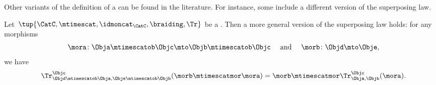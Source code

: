 
\begin{remark}
    Other variants of the definition of a  can be found in the literature. For instance, some include a different version of the superposing law.
\end{remark}

\begin{lemma}
    \label{lem:general-superposing-law}
    Let~$\tup{\CatC, \mtimescat,\idmoncat_{\CatC}, \braiding, \Tr}$ be a .
    Then a more general version of the superposing law holds: for any morphisms~
    $$\mora\colon \Obja\mtimescatob \Objc \mto \Objb \mtimescatob \Objc \quad \text{ and } \quad \morb \colon \Objd \mto \Obje,$$
    we have 
    \begin{equation}
        \label{eq:superposing_2}
        \Tr_{\Objd\mtimescatob \Obja,\Obje\mtimescatob \Objb}^{\Objc}(\morb \mtimescatmor \mora)=\morb \mtimescatmor \Tr_{\Obja,\Objb}^\Objc(\mora).
    \end{equation}
\end{lemma}





